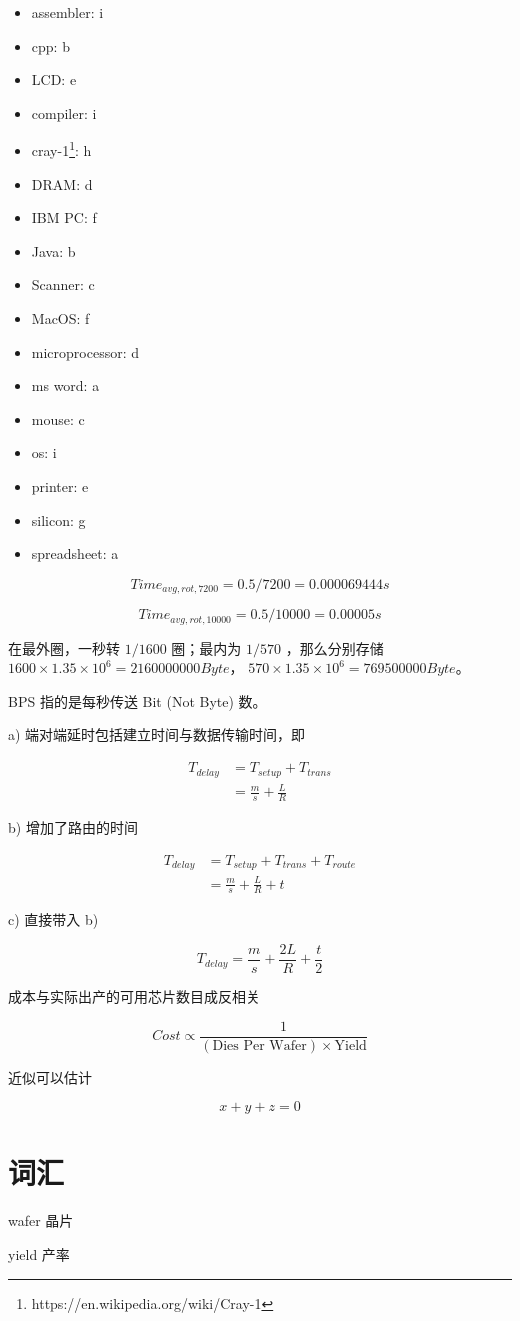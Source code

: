 \documentclass[lang=cn,11pt,a4paper,cite=authoryear]{elegantpaper}
\begin{document}
\begin{itemize}
    \item assembler: i 
    \item cpp: b
    \item LCD: e 
    \item compiler: i 
    \item cray-1\footnote{https://en.wikipedia.org/wiki/Cray-1}: h
    \item DRAM: d
    \item IBM PC: f
    \item Java: b
    \item Scanner: c 
    \item MacOS: f 
    \item microprocessor: d
    \item ms word: a 
    \item mouse: c
    \item os: i 
    \item printer: e 
    \item silicon: g 
    \item spreadsheet: a
\end{itemize}


\[Time_{avg,rot,7200} = 0.5 / 7200 = 0.000069444 s\]

\[Time_{avg,rot,10000} = 0.5 / 10000 = 0.00005 s\]


在最外圈，一秒转 \(1/1600\) 圈；最内为 \(1/570\) ，那么分别存储 \(1600 \times 1.35 \times 10^6 = 2160000000 Byte\)， \(570 \times 1.35 \times 10^6 = 769500000 Byte\)。


BPS 指的是每秒传送 Bit (Not Byte) 数。

a) 端对端延时包括建立时间与数据传输时间，即

\[
\begin{aligned}
    T_{delay} &= T_{setup} + T_{trans} \\
    &= \frac{m}{s} + \frac{L}{R}
\end{aligned}
\]


b) 增加了路由的时间

\[
\begin{aligned}
    T_{delay} &= T_{setup} + T_{trans} + T_{route}\\
    &= \frac{m}{s} + \frac{L}{R} + t
\end{aligned}
\]


c) 直接带入 b)

\[T_{delay} = \frac{m}{s} + \frac{2L}{R} + \frac{t}{2}\]




成本与实际出产的可用芯片数目成反相关

\[Cost \propto \frac{1}{(\text{Dies Per Wafer}) \times \text{Yield}}\]

近似可以估计

\[x + y + z = 0\]

\section*{词汇}

wafer 晶片

yield 产率

\end{document}

